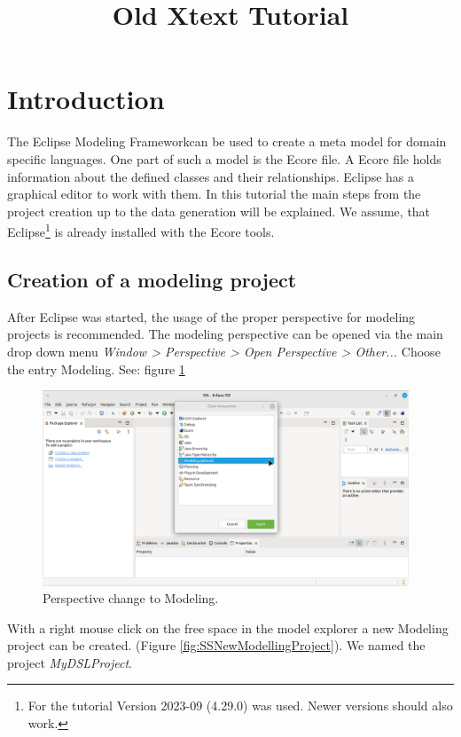 \documentclass[a4paper,10pt]{article}
\title{Old Xtext Tutorial}
\author{}
\newcommand{\gerquot}[1]{\glqq#1\grqq}
\newcommand{\dashAndSpace}{\textendash \space}
\newcommand{\dashAndSpaceSeq}[1]{\dashAndSpace#1 \textendash}
\newcommand{\DSL}{domain specific language}
\newcommand{\EMF}{Eclipse Modeling Framework}
\newcommand{\ProjectName}{MyDSLProject}
\newcommand{\ScreenshotWidth}{0.975}
\begin{document}
\maketitle

\section{Introduction}\label{s:Introduction}
The \EMF\space can be used to create a meta model for \DSL s. One part of such a model is the Ecore file. A Ecore file holds information about the defined classes and their relationships. Eclipse has a graphical editor to work with them. In this tutorial the main steps \dashAndSpaceSeq{from the project creation up to the data generation} will be explained. We assume, that Eclipse\footnote{For the tutorial Version 2023-09 (4.29.0) was used. Newer versions should also work.} is already installed with the Ecore tools.

\subsection{Creation of a modeling project}\label{ss:CreationModelingProject}
After Eclipse was started, the usage of the proper perspective for modeling projects is recommended. The modeling perspective can be opened via the main drop down menu \emph{Window > Perspective > Open Perspective > Other...} Choose the entry \gerquot{Modeling}. See: figure \ref{fig:SSPerspectiveChange}

\begin{figure}[H]
\centering
\includegraphics[width=\ScreenshotWidth\textwidth]{./Screenshots/SS_2.png}
\caption{Perspective change to \gerquot{Modeling}.}
\label{fig:SSPerspectiveChange}
\end{figure}

With a right mouse click on the free space in the model explorer a new Modeling project can be created. (Figure \ref{fig:SSNewModellingProject}). We named the project \emph{\ProjectName}.
\end{document}
